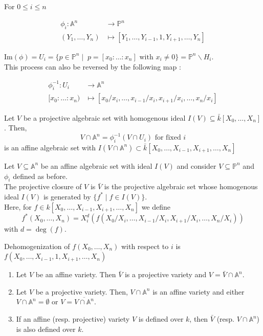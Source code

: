 \documentclass[oneside, 12pt]{scrbook}
\theoremstyle{theorem}
\begin{document}
For $ 0 \le i \le n$
\begin{center}
\begin{align*}
\phi_{i}: \mathbb{A}^n &\rightarrow \mathbb{P}^n \\
(Y_{1}, \hdots , Y_{n}) &\mapsto [Y_{1}, \hdots , Y_{i-1}, 1, Y_{i+1} , \hdots , Y_{n}]
\end{align*}
\end{center}
$\mathrm{Im}(\phi) = U_{i} = \{p \in \mathbb{P}^n \mid \; p =[x_{0}: \hdots  : x_{n}] \text{ with } x_{i} \neq 0\} = \mathbb{P}^n \backslash H_{i}$. \\
This process can also be reversed by the following map : 
\begin{center}
\begin{align*}
\phi_{i}^{-1}: U_{i} &\rightarrow \mathbb{A}^n \\
[x_{0}: \hdots : x_{n}) &\mapsto [x_{0}/x_{i}, \hdots , x_{i-1}/x_{i}, x_{i+1}/x_{i} , \hdots , x_{n}/x_{i}]
\end{align*}
\end{center}

Let $V$ be a projective algebraic set with homogenous ideal $I(V) \subseteq \bar{k}[X_{0} ,\hdots , X_{n}]$. Then, $$V \cap \mathbb{A}^n = \phi_{i}^{-1}(V \cap U_{i}) \text{ for fixed } i $$ is an affine algebraic set with $I(V \cap \mathbb{A}^n ) \subset \bar{k}[X_{0} , \hdots , X_{i-1},X_{i+1}, \hdots , X_{n}]$

\begin{definition}
Let $V \subseteq \mathbb{A}^n$ be an affine algebraic set with ideal $I(V)$ and consider $V \subseteq \mathbb{P}^n$ and $\phi_{i}$ defined as before. \\
The projective closure of $V$ is $\bar{V}$ is the projective algebraic set whose homogenous ideal $I(V)$ is generated by $\{f^* \mid f \in I(V)\}$. \\
Here, for $f \in k[X_{0}, \hdots , X_{i-1}, X_{i+1}, \hdots , X_{n}]$ we define $$f^* (X_{0} , \hdots , X_{n}) = X_{i}^d (f(X_{0}/X_{i}, \hdots , X_{i-1}/X_{i}, X_{i+1}/X_{i}, \hdots , X_{n}/X_{i}))$$ with $d = \deg (f)$.
\end{definition}

\begin{definition}
Dehomogenization of $f(X_{0}, \hdots , X_{n})$ with respect to $i$ is $f(X_{0}, \hdots , X_{i-1}, 1 , X_{i+1}, \hdots ,X_{n})$
\end{definition}

\begin{proposition}
\begin{enumerate}
\item Let $V$ be an affine variety. Then $\bar{V}$ is a projective variety and $V = \bar{V} \cap \mathbb{A}^n$. 
\item Let $V$ be a projective variety. Then, $V \cap \mathbb{A}^n$ is an affine variety and either $V \cap \mathbb{A}^n = \emptyset$ or $V = \overline{V \cap \mathbb{A}^n}$. 
\item If an affine (resp. projective) variety $V$ is defined over $k$, then $\bar{V}$ (resp. $V \cap \mathbb{A}^n$) is also defined over $k$.
\end{enumerate}
\end{proposition}
\end{document}
